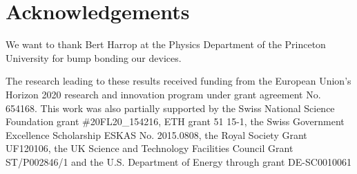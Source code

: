 \section*{Acknowledgements} 
We want to thank Bert Harrop at the Physics Department of the Princeton University for bump bonding our devices.\par
The research leading to these results received funding from the European Union's Horizon 2020 research and innovation program under grant agreement No. 654168. This work was also partially supported by the Swiss National Science Foundation grant \#20FL20\_154216, ETH grant 51 15-1, the  Swiss Government Excellence Scholarship ESKAS No. 2015.0808, the Royal Society Grant UF120106, the UK Science and Technology Facilities Council Grant ST/P002846/1 and the U.S. Department of Energy through grant DE-SC0010061
